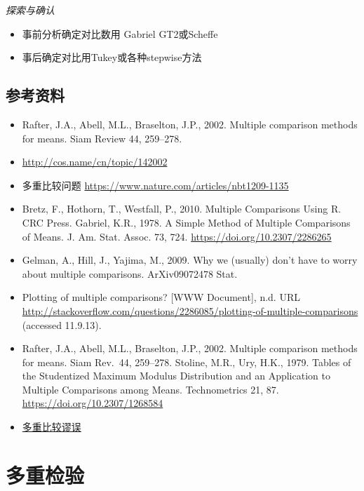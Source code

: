 \documentclass[]{tufte-book}
\providecommand{\tightlist}{%
  \setlength{\itemsep}{0pt}\setlength{\parskip}{0pt}}
\begin{document}
\emph{探索与确认}

\begin{itemize}
\tightlist
\item
  事前分析确定对比数用 Gabriel GT2或Scheffe
\item
  事后确定对比用Tukey或各种stepwise方法
\end{itemize}

\hypertarget{ux53c2ux8003ux8d44ux6599}{%
\subsection{参考资料}\label{ux53c2ux8003ux8d44ux6599}}

\begin{itemize}
\tightlist
\item
  Rafter, J.A., Abell, M.L., Braselton, J.P., 2002. Multiple comparison methods for means. Siam Review 44, 259--278.
\item
  \url{http://cos.name/cn/topic/142002}
\item
  多重比较问题 \url{https://www.nature.com/articles/nbt1209-1135}
\item
  Bretz, F., Hothorn, T., Westfall, P., 2010. Multiple Comparisons Using R. CRC Press.
  Gabriel, K.R., 1978. A Simple Method of Multiple Comparisons of Means. J. Am. Stat. Assoc. 73, 724. \url{https://doi.org/10.2307/2286265}
\item
  Gelman, A., Hill, J., Yajima, M., 2009. Why we (usually) don't have to worry about multiple comparisons. ArXiv09072478 Stat.
\item
  Plotting of multiple comparisons? {[}WWW Document{]}, n.d. URL \url{http://stackoverflow.com/questions/2286085/plotting-of-multiple-comparisons} (accessed 11.9.13).
\item
  Rafter, J.A., Abell, M.L., Braselton, J.P., 2002. Multiple comparison methods for means. Siam Rev.~44, 259--278.
  Stoline, M.R., Ury, H.K., 1979. Tables of the Studentized Maximum Modulus Distribution and an Application to Multiple Comparisons among Means. Technometrics 21, 87. \url{https://doi.org/10.2307/1268584}
\item
  \href{https://zh.wikipedia.org/wiki/\%E5\%A4\%9A\%E9\%87\%8D\%E6\%AF\%94\%E8\%BC\%83\%E8\%AC\%AC\%E8\%AA\%A4}{多重比较谬误}
\end{itemize}

\hypertarget{ux591aux91cdux68c0ux9a8c}{%
\section{多重检验}\label{ux591aux91cdux68c0ux9a8c}}
\end{document}

